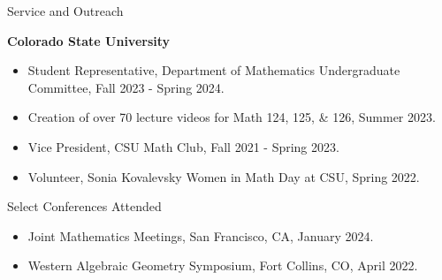 \documentclass[
	11pt, %
]{resume} %
\begin{document}

\begin{rSection}{Service and Outreach}

	\textbf{Colorado State University}
	\begin{itemize}
		\item{Student Representative, Department of Mathematics Undergraduate Committee, Fall 2023 - Spring 2024.}
		\item{Creation of over 70 lecture videos for Math 124, 125, \& 126, Summer 2023.}
		\item{Vice President, CSU Math Club, Fall 2021 - Spring 2023.}
		\item{Volunteer, Sonia Kovalevsky Women in Math Day at CSU, Spring 2022.}
	\end{itemize}
	
\end{rSection}


\begin{rSection}{Select Conferences Attended}

	\begin{itemize}
		\item{Joint Mathematics Meetings, San Francisco, CA, January 2024.}
		\item{Western Algebraic Geometry Symposium, Fort Collins, CO, April 2022.}
	\end{itemize}
	
\end{rSection}





\fancyfoot{}
\end{document}

